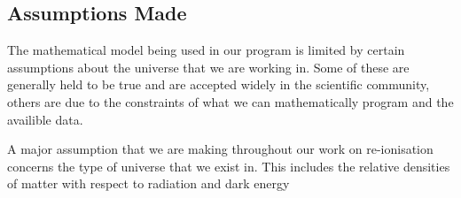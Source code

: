 
\subsection{Assumptions Made}
	The mathematical model being used in our program is limited by certain assumptions about the universe that we are working in. Some of these are generally held to be true and are accepted widely in the scientific community, others are due to the constraints of what we can mathematically program and the availible data.
	
	A major assumption that we are making throughout our work on re-ionisation concerns the type of universe that we exist in. This includes the relative densities of matter with respect to radiation and dark energy